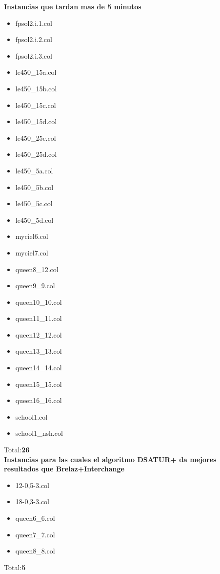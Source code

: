 \documentclass[a4paper,10pt]{article}
\begin{document}
\textbf{Instancias que tardan mas de 5 minutos}
\begin{itemize}
 \item fpsol2.i.1.col
 \item fpsol2.i.2.col
 \item fpsol2.i.3.col
 \item le450\_15a.col
 \item le450\_15b.col
 \item le450\_15c.col
 \item le450\_15d.col
 \item le450\_25c.col
 \item le450\_25d.col
 \item le450\_5a.col
 \item le450\_5b.col
 \item le450\_5c.col
 \item le450\_5d.col
 \item myciel6.col
 \item myciel7.col
 \item queen8\_12.col
 \item queen9\_9.col
 \item queen10\_10.col
 \item queen11\_11.col
 \item queen12\_12.col
 \item queen13\_13.col
 \item queen14\_14.col
 \item queen15\_15.col
 \item queen16\_16.col
 \item school1.col
 \item school1\_nsh.col
\end{itemize}
\indent Total:\textbf{26}\\

\textbf{Instancias para las cuales el algoritmo DSATUR+ da mejores resultados que Brelaz+Interchange}
\begin{itemize}
 \item 12-0,5-3.col
 \item 18-0,3-3.col
 \item queen6\_6.col
 \item queen7\_7.col
 \item queen8\_8.col
\end{itemize}
\indent Total:\textbf{5}\\
\end{document}
